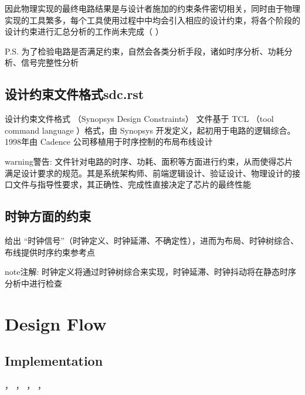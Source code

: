 \documentclass[letterpaper,10pt,english]{sphinxmanual}
\begin{document}
\sphinxAtStartPar
因此物理实现的最终电路结果是与设计者施加的约束条件密切相关，同时由于物理实现的工具繁多，每个工具使用过程中中均会引入相应的设计约束，将各个阶段的设计约束进行汇总分析的工作尚未完成（  ）

\sphinxAtStartPar
P.S. 为了检验电路是否满足约束，自然会各类分析手段，诸如时序分析、功耗分析、信号完整性分析


\subsection{设计约束文件格式sdc.rst}
\label{\detokenize{chapter1/_u6807_u51c6_u8bbe_u8ba1_u7ea6_u675fsdc:sdc-rst}}\label{\detokenize{chapter1/_u6807_u51c6_u8bbe_u8ba1_u7ea6_u675fsdc::doc}}
\sphinxAtStartPar
设计约束文件格式  （Synopsys Design Constraints） 文件基于 TCL （tool command language ）格式，由 Synopsys 开发定义，起初用于电路的逻辑综合。1998年由 Cadence 公司移植用于时序控制的布局布线设计

\begin{sphinxadmonition}{warning}{警告:}
\sphinxAtStartPar
{} 文件针对电路的时序、功耗、面积等方面进行约束，从而使得芯片满足设计要求的规范。其是系统架构师、前端逻辑设计、验证设计、物理设计的接口文件与指导性要求，其正确性、完成性直接决定了芯片的最终性能
\end{sphinxadmonition}


\subsection{时钟方面的约束}
\label{\detokenize{chapter1/_u8bbe_u8ba1_u7ea6_u675f:id2}}
\sphinxAtStartPar
给出 “时钟信号”（时钟定义、时钟延滞、不确定性），进而为布局、时钟树综合、布线提供时序约束参考点

\begin{sphinxadmonition}{note}{注解:}
\sphinxAtStartPar
时钟定义将通过时钟树综合来实现，时钟延滞、时钟抖动将在静态时序分析中进行检查
\end{sphinxadmonition}


\section{Design Flow}
\label{\detokenize{chapter1/Design_Flow:design-flow}}\label{\detokenize{chapter1/Design_Flow::doc}}

\subsection{Implementation}
\label{\detokenize{chapter1/Design_Flow:implementation}}
\sphinxAtStartPar
{\hyperref[\detokenize{chapter4/index::doc}]{}} ， {\hyperref[\detokenize{chapter5/index::doc}]{}}， {\hyperref[\detokenize{chapter6/index::doc}]{}}， {\hyperref[\detokenize{chapter7/index::doc}]{}}， {\hyperref[\detokenize{chapter8/index::doc}]{}}
\end{document}
